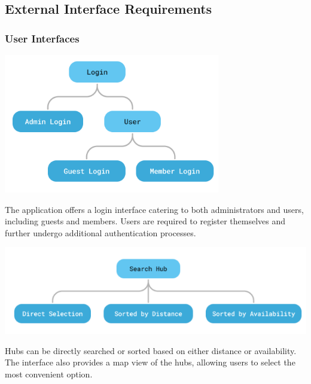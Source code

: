 \documentclass[11pt]{article}
\begin{document}
\subsection{External Interface Requirements}
\subsubsection{User Interfaces}

\begin{center}
    \includegraphics*{login-interface.png}
\end{center}
The application offers a login interface catering to both administrators and users, including guests and members. Users are required to register themselves and further undergo additional authentication processes.

\begin{center}
    \includegraphics*{search-interface.png}
\end{center}
Hubs can be directly searched or sorted based on either distance or availability. The interface also provides a map view of the hubs, allowing users to select the most convenient option.
\end{document}
